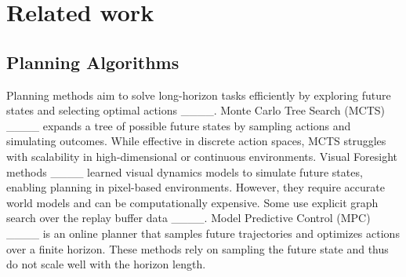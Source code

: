 \section{Related work}
\label{sec:related_work}







\subsection{Planning Algorithms}

Planning methods aim to solve long-horizon tasks efficiently by exploring future states and selecting optimal actions ____.
Monte Carlo Tree Search (MCTS) ____ expands a tree of possible future states by sampling actions and simulating outcomes.
While effective in discrete action spaces, MCTS struggles with scalability in high-dimensional or continuous environments.
Visual Foresight methods ____ learned visual dynamics models to simulate future states, enabling planning in pixel-based environments.
However, they require accurate world models and can be computationally expensive.
Some use explicit graph search over the replay buffer data ____.
Model Predictive Control (MPC) ____ is an online planner that samples future trajectories and optimizes actions over a finite horizon.
These methods rely on sampling the future state and thus do not scale well with the horizon length.

